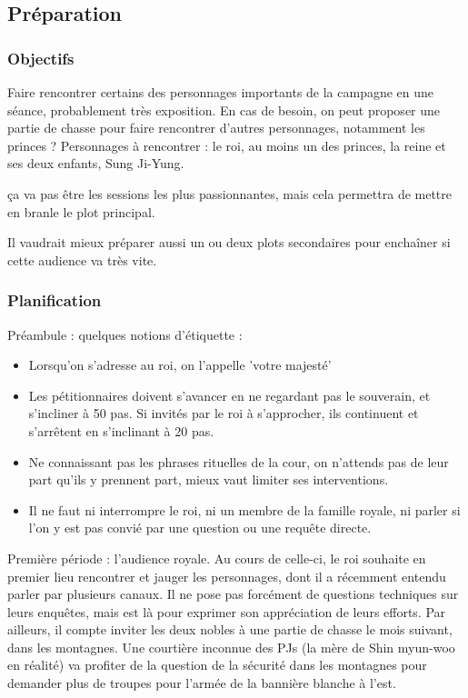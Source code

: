 \documentclass[10pt,a4paper]{book}
\begin{document}
\subsection{Préparation}
\subsubsection{Objectifs}
Faire rencontrer certains des personnages importants de la campagne en une séance, probablement très exposition. En cas de besoin, on peut proposer une partie de chasse pour faire rencontrer d'autres personnages, notamment les princes ? Personnages à rencontrer : le roi, au moins un des princes, la reine et ses deux enfants, Sung Ji-Yung.

ça va pas être les sessions les plus passionnantes, mais cela permettra de mettre en branle le plot principal.

Il vaudrait mieux préparer aussi un ou deux plots secondaires pour enchaîner si cette audience va très vite. 
\subsubsection{Planification}
Préambule : quelques notions d'étiquette :
\begin{itemize}
\item Lorsqu'on s'adresse au roi, on l'appelle 'votre majesté'
\item Les pétitionnaires doivent s'avancer en ne regardant pas le souverain, et s'incliner à 50 pas. Si invités par le roi à s'approcher, ils continuent et s'arrêtent en s'inclinant à 20 pas.
\item Ne connaissant pas les phrases rituelles de la cour, on n'attends pas de leur part qu'ils y prennent part, mieux vaut limiter ses interventions.
\item Il ne faut ni interrompre le roi, ni un membre de la famille royale, ni parler si l'on y est pas convié par une question ou une requête directe.

\end{itemize}
Première période : l'audience royale. Au cours de celle-ci, le roi souhaite en premier lieu rencontrer et jauger les personnages, dont il a récemment entendu parler par plusieurs canaux. Il ne pose pas forcément de questions techniques sur leurs enquêtes, mais est là pour exprimer son appréciation de leurs efforts. Par ailleurs, il compte inviter les deux nobles à une partie de chasse le mois suivant, dans les montagnes. Une courtière inconnue des PJs (la mère de Shin myun-woo en réalité) va profiter de la question de la sécurité dans les montagnes pour demander plus de troupes pour l'armée de la bannière blanche à l'est.
\end{document}
